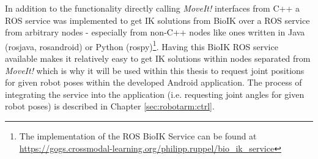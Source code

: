 In addition to the functionality directly calling \textit{MoveIt!} interfaces from C++ a ROS service was implemented to get IK solutions from BioIK over a ROS service from arbitrary nodes - especially from non-C++ nodes like ones written in Java (rosjava, rosandroid) or Python (rospy)\footnote{The implementation of the ROS BioIK Service can be found at \url{https://gogs.crossmodal-learning.org/philipp.ruppel/bio_ik_service}}. 
Having this BioIK ROS service available makes it relatively easy to get IK solutions within nodes separated from \textit{MoveIt!} which is why it will be used within this thesis to request joint positions for given robot poses within the developed Android application. The process of integrating the service into the application (i.e. requesting joint angles for given robot poses) is described in Chapter \ref{sec:robotarm:ctrl}.